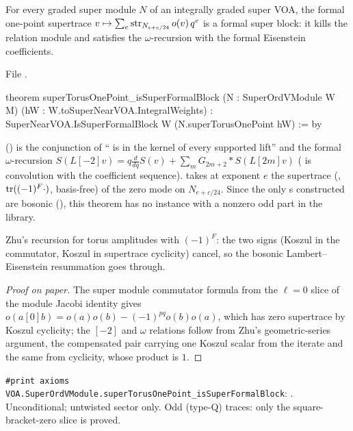 \begin{theorem}\label{l17:thm:formalblock}
For every graded super module $N$ of an integrally graded super VOA, the formal one-point supertrace
$v\mapsto\sum_e\operatorname{str}_{N_{e+c/24}}o(v)\,q^e$ is a formal super block: it kills the relation
module and satisfies the $\omega$-recursion with the formal Eisenstein coefficients.
\end{theorem}
\noindent File .
\begin{leancode}
theorem superTorusOnePoint_isSuperFormalBlock
    (N : SuperOrdVModule W M) (hW : W.toSuperNearVOA.IntegralWeights) :
    SuperNearVOA.IsSuperFormalBlock W (N.superTorusOnePoint hW) := by
\end{leancode}
\begin{dictionary}
 () is the conjunction of
`` is in the kernel of every supported lift'' and the formal $\omega$-recursion
$S(L[-2]v)=q\frac{d}{dq}S(v)+\sum_m G_{2m+2}\ast S(L[2m]v)$ ( is convolution with the
coefficient sequence).  takes at exponent $e$ the supertrace (,
$\operatorname{tr}((-1)^F\cdot)$, basis-free) of the zero mode on $N_{e+c/24}$. Since the only s
constructed are bosonic (), this theorem has no instance with a nonzero odd
part in the library.
\end{dictionary}
\begin{physics}
Zhu's recursion for torus amplitudes with $(-1)^F$: the two signs (Koszul in the commutator, Koszul in
supertrace cyclicity) cancel, so the bosonic Lambert--Eisenstein resummation goes through.
\end{physics}
\begin{proof}[Proof on paper]
The super module commutator formula from the $\ell=0$ slice of the module Jacobi identity gives
$o(a[0]b)=o(a)o(b)-(-1)^{pq}o(b)o(a)$, which has zero supertrace by Koszul cyclicity; the $[-2]$ and
$\omega$ relations follow from Zhu's geometric-series argument, the compensated pair carrying one
Koszul scalar from the iterate and the same from cyclicity, whose product is $1$.
\end{proof}
\begin{status}
\texttt{\#print axioms VOA.SuperOrdVModule.superTorusOnePoint\_isSuperFormalBlock}: . Unconditional; untwisted sector only. Odd (type-Q) traces: only the
square-bracket-zero slice is proved.
\end{status}

